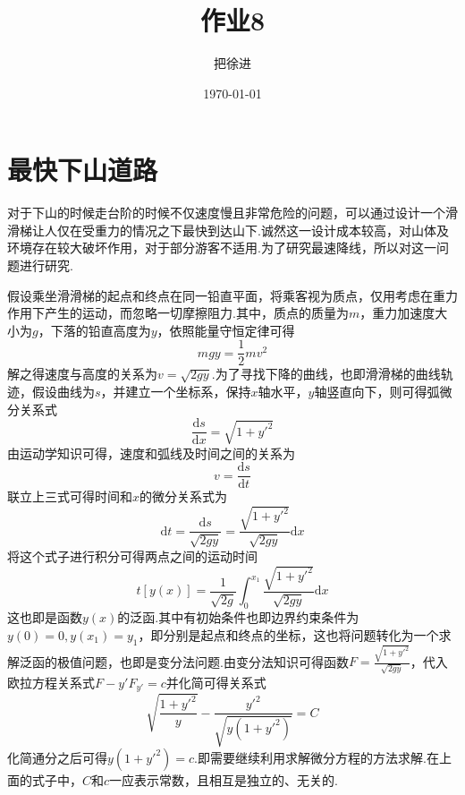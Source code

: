 \documentclass{article}
\title{\heiti 作业8}
\author{\kaishu 把徐进}
\date{\kaishu\today}
\begin{document}
	\maketitle
	\section{最快下山道路}
	对于下山的时候走台阶的时候不仅速度慢且非常危险的问题，可以通过设计一个滑滑梯让人仅在受重力的情况之下最快到达山下.诚然这一设计成本较高，对山体及环境存在较大破坏作用，对于部分游客不适用.为了研究最速降线，所以对这一问题进行研究.
	
	假设乘坐滑滑梯的起点和终点在同一铅直平面，将乘客视为质点，仅用考虑在重力作用下产生的运动，而忽略一切摩擦阻力.其中，质点的质量为$m$，重力加速度大小为$g$，下落的铅直高度为$y$，依照能量守恒定律可得
	\begin{equation}
		mgy=\frac{1}{2}mv^2
	\end{equation}
	解之得速度与高度的关系为$v=\sqrt{2gy}$.为了寻找下降的曲线，也即滑滑梯的曲线轨迹，假设曲线为$s$，并建立一个坐标系，保持$x$轴水平，$y$轴竖直向下，则可得弧微分关系式
	\begin{equation}
		\frac{\mathrm{d}s}{\mathrm{d}x}=\sqrt{1+y'^2}
	\end{equation}
	由运动学知识可得，速度和弧线及时间之间的关系为
	\begin{equation}
		v=\frac{\mathrm{d}s}{\mathrm{d}t}
	\end{equation}
	联立上三式可得时间和$x$的微分关系式为
	\begin{equation}
	\mathrm{d}t=\frac{\mathrm{d}s}{\sqrt{2gy}}=\frac{\sqrt{1+y'^2}}{\sqrt{2gy}}\mathrm{d}x
	\end{equation}
	将这个式子进行积分可得两点之间的运动时间
	\begin{equation}
	t[y(x)]=\frac{1}{\sqrt{2g}}\int_{0}^{x_1}\frac{\sqrt{1+y'^2}}{\sqrt{2gy}}\mathrm{d}x
	\end{equation}
	这也即是函数$y(x)$的泛函.其中有初始条件也即边界约束条件为$y(0)=0,y(x_1)=y_1$，即分别是起点和终点的坐标，这也将问题转化为一个求解泛函的极值问题，也即是变分法问题.由变分法知识可得函数$F=\frac{\sqrt{1+y'^2}}{\sqrt{2gy}}$，代入欧拉方程关系式$F-y'F_{y'}=c$并化简可得关系式
	\begin{equation}
	\sqrt{\frac{1+y'^2}{y}}-\frac{y'^2}{\sqrt{y(1+y'^2)}}=C
	\end{equation}
	化简通分之后可得$y(1+y'^2)=c$.即需要继续利用求解微分方程的方法求解.在上面的式子中，$C$和$c$一应表示常数，且相互是独立的、无关的.
	
\end{document}
